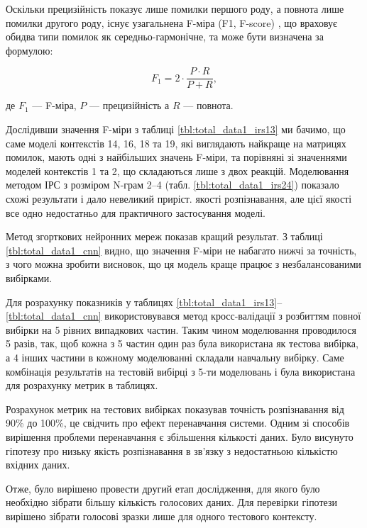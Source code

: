 Оскільки прецизійність показує лише помилки першого роду, а повнота лише помилки другого роду, існує узагальнена F-міра (F1, F-score) \cite{Powers_2011,Sasaki_2007}, що враховує обидва типи помилок як середньо-гармонічне, та може бути визначена за формулою:

\begin{equation}
\label{eq:f1}
F_1 = 2 \cdot \frac{P \cdot R}{P + R},
\end{equation}

де $F_1$ --- F-міра, $P$ --- прецизійність а $R$ --- повнота.

Дослідивши значення F-міри з таблиці \ref{tbl:total_data1_irs13} ми бачимо, що саме моделі контекстів 14, 16, 18 та 19, які виглядають найкраще на матрицях помилок, мають одні з найбільших значень F-міри, та порівняні зі значеннями моделей контекстів 1 та 2, що складаються лише з двох реакцій. Моделювання методом ІРС з розміром N-грам 2–4 (табл. \ref{tbl:total_data1_irs24}) показало схожі результати і дало невеликий приріст. якості розпізнавання, але цієї якості все одно недостатньо для практичного застосування моделі.

Метод згорткових нейронних мереж показав кращий результат. З таблиці \ref{tbl:total_data1_cnn} видно, що значення F-міри не набагато нижчі за точність, з чого можна зробити висновок, що ця модель краще працює з незбалансованими вибірками.

Для розрахунку показників у таблицях \ref{tbl:total_data1_irs13}--\ref{tbl:total_data1_cnn} використовувався метод кросс-валідації \cite{Kohavi_1995} з розбиттям повної вибірки на 5 рівних випадкових частин. Таким чином моделювання проводилося 5 разів, так, щоб кожна з 5 частин один раз була використана як тестова вибірка, а 4 інших частини в кожному моделюванні складали навчальну вибірку. Саме комбінація результатів на тестовій вибірці з 5-ти моделювань і була використана для розрахунку метрик в таблицях.

Розрахунок метрик на тестових вибірках показував точність розпізнавання від 90\% до 100\%, це свідчить про ефект перенавчання системи. Одним зі способів вирішення проблеми перенавчання є збільшення кількості даних. Було висунуто гіпотезу про низьку якість розпізнавання в зв’язку з недостатньою кількістю вхідних даних.

Отже, було вирішено провести другий етап дослідження, для якого було необхідно зібрати більшу кількість голосових даних. Для перевірки гіпотези вирішено зібрати голосові зразки лише для одного тестового контексту.

